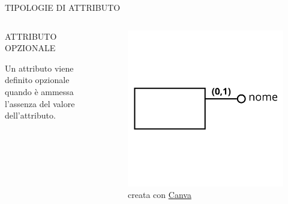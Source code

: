 \documentclass[aspectratio=1610]{beamer}
\begin{document}
\begin{frame}{TIPOLOGIE DI ATTRIBUTO}
    \begin{columns}
            \begin{alertblock}{ATTRIBUTO OPZIONALE}
                \begin{minipage}{0.96\linewidth}
                    \justifying
                    Un attributo viene definito opzionale quando è ammessa l’assenza del 
                    valore dell’attributo.\\
                    \bigskip
                \end{minipage}
            \end{alertblock}
            \begin{figure}
                \includegraphics[width=\linewidth]{img/attributo_opzionale.png}
                \caption{{creata con \href{www.canva.com}{Canva}}}
            \end{figure}
    \end{columns}
\end{frame}
\end{document}
